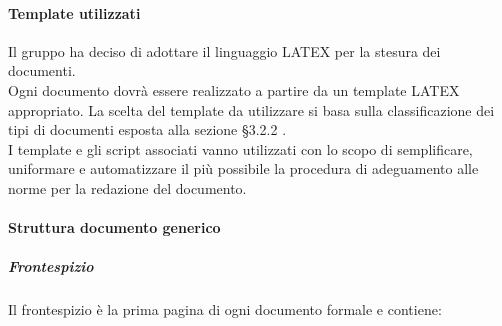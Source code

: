             \paragraph{Template utilizzati }
                Il gruppo ha deciso di adottare il linguaggio LATEX per la stesura dei documenti. \\
                Ogni documento dovrà essere realizzato a partire da un template LATEX appropriato. La scelta del template da utilizzare si basa sulla classificazione dei tipi di documenti esposta alla sezione §3.2.2 .\\
                I template e gli script associati vanno utilizzati con lo scopo di semplificare, uniformare e automatizzare il più possibile la procedura di adeguamento alle norme per la redazione del documento.\\
            \paragraph{Struttura documento generico}
                \subparagraph{Frontespizio}
                    Il frontespizio è la prima pagina di ogni documento formale e contiene: \\
